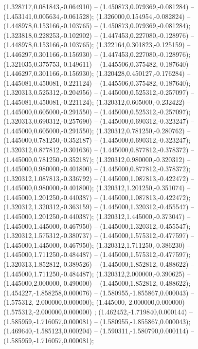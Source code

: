  (1.328717,0.081843,-0.064910) -- (1.450873,0.079369,-0.081284) -- (1.453141,0.005634,-0.061528);
 (1.326000,0.154954,-0.082824) -- (1.448978,0.153166,-0.103765) -- (1.450873,0.079369,-0.081284);
 (1.323818,0.228253,-0.102902) -- (1.447453,0.227080,-0.128976) -- (1.448978,0.153166,-0.103765);
 (1.322164,0.301823,-0.125159) -- (1.446297,0.301166,-0.156930) -- (1.447453,0.227080,-0.128976);
 (1.321035,0.375753,-0.149611) -- (1.445506,0.375482,-0.187640) -- (1.446297,0.301166,-0.156930);
 (1.320428,0.450127,-0.176284) -- (1.445081,0.450081,-0.221124) -- (1.445506,0.375482,-0.187640);
 (1.320313,0.525312,-0.204956) -- (1.445000,0.525312,-0.257097) -- (1.445081,0.450081,-0.221124);
 (1.320312,0.605000,-0.232422) -- (1.445000,0.605000,-0.291550) -- (1.445000,0.525312,-0.257097);
 (1.320313,0.690312,-0.257690) -- (1.445000,0.690312,-0.323247) -- (1.445000,0.605000,-0.291550);
 (1.320312,0.781250,-0.280762) -- (1.445000,0.781250,-0.352187) -- (1.445000,0.690312,-0.323247);
 (1.320312,0.877812,-0.301636) -- (1.445000,0.877812,-0.378372) -- (1.445000,0.781250,-0.352187);
 (1.320312,0.980000,-0.320312) -- (1.445000,0.980000,-0.401800) -- (1.445000,0.877812,-0.378372);
 (1.320312,1.087813,-0.336792) -- (1.445000,1.087813,-0.422472) -- (1.445000,0.980000,-0.401800);
 (1.320312,1.201250,-0.351074) -- (1.445000,1.201250,-0.440387) -- (1.445000,1.087813,-0.422472);
 (1.320312,1.320312,-0.363159) -- (1.445000,1.320312,-0.455547) -- (1.445000,1.201250,-0.440387);
 (1.320312,1.445000,-0.373047) -- (1.445000,1.445000,-0.467950) -- (1.445000,1.320312,-0.455547);
 (1.320312,1.575312,-0.380737) -- (1.445000,1.575312,-0.477597) -- (1.445000,1.445000,-0.467950);
 (1.320312,1.711250,-0.386230) -- (1.445000,1.711250,-0.484487) -- (1.445000,1.575312,-0.477597);
 (1.320313,1.852812,-0.389526) -- (1.445000,1.852812,-0.488622) -- (1.445000,1.711250,-0.484487);
 (1.320312,2.000000,-0.390625) -- (1.445000,2.000000,-0.490000) -- (1.445000,1.852812,-0.488622);
 (1.454227,-1.858258,0.000076) -- (1.580955,-1.855867,0.000043) -- (1.575312,-2.000000,0.000000);
 (1.445000,-2.000000,0.000000) -- (1.575312,-2.000000,0.000000) ;
 (1.462452,-1.719840,0.000144) -- (1.585959,-1.716057,0.000081) -- (1.580955,-1.855867,0.000043);
 (1.469640,-1.585123,0.000204) -- (1.590311,-1.580790,0.000114) -- (1.585959,-1.716057,0.000081);
